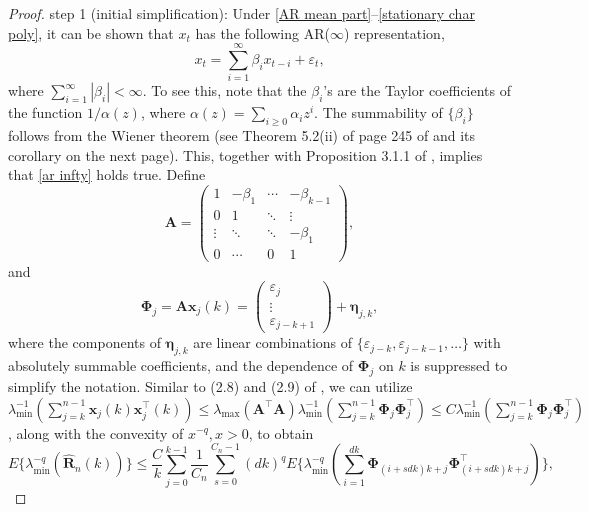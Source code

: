 \documentclass[ejsv2]{imsart}
\theoremstyle{plain}
\theoremstyle{definition}
\theoremstyle{remark}
\begin{document}
\begin{proof}
\vspace{0.3cm}
{\sc step 1 (initial simplification):}
Under \eqref{AR mean part}--\eqref{stationary char poly}, it can be shown that $x_t$ has the following AR($\infty$) representation,
\begin{equation}\label{ar infty}
x_t=\sum_{i=1}^{\infty}\beta_ix_{t-i}+\varepsilon_t,
\end{equation}
where $\sum_{i=1}^{\infty}|\beta_i|<\infty$. To see this, note that the $\beta_i$'s are the Taylor coefficients of the function $1/\alpha(z)$, where $\alpha(z) =
\sum_{i\geq0}\alpha_iz^i$. The summability of $\{\beta_i\}$ follows from the Wiener theorem (see Theorem 5.2(ii) of page 245 of \cite{Zygmund2002} and its corollary on the next page). This, together with Proposition 3.1.1 of \cite{Brockwell1991}, implies that \eqref{ar infty} holds true. Define
$$\mathbf{A}=\begin{pmatrix}
    1 & -\beta_1 & \cdots & -\beta_{k-1} \\
    0 & 1 & \ddots & \vdots \\
    \vdots & \ddots & \ddots & -\beta_1 \\
    0 & \cdots & 0 & 1
  \end{pmatrix},$$
and
\begin{equation}\label{pt.fisher.1}
\bm{\Phi}_j=\mathbf{A}\mathbf{x}_j(k)=\begin{pmatrix}
\varepsilon_j\\
\vdots\\
\varepsilon_{j-k+1}
\end{pmatrix}
+\bm{\eta}_{j,k},
\end{equation}
where the components of $\bm{\eta}_{j, k}$
are linear combinations of
$\{\varepsilon_{j-k},\varepsilon_{j-k-1},\ldots\}$
with absolutely summable coefficients,
and the dependence of $\bm{\Phi}_j$ on $k$ is suppressed to simplify the notation. 
Similar to (2.8) and (2.9) of \cite{Ing2003}, we can utilize $\lambda_{\min}^{-1}(\sum_{j=k}^{n-1}\mathbf{x}_j(k)\mathbf{x}_j^\top(k))\leq\lambda_{\max}(\mathbf{A}^\top\mathbf{A})\lambda_{\min}^{-1}(\sum_{j=k}^{n-1}\bm{\Phi}_j\bm{\Phi}_j^\top) \leq 
C \lambda_{\min}^{-1}(\sum_{j=k}^{n-1}\bm{\Phi}_j\bm{\Phi}_j^\top)$, along with the convexity of $x^{-q}, x>0$, to obtain
\begin{equation}\label{pt.fisher.2.0}
E\{\lambda_{\min}^{-q}(\hat{\mathbf{R}}_n(k))\}\leq \frac{C}{k}\sum_{j=0}^{k-1}\frac{1}{C_n}\sum_{s=0}^{C_n-1}(dk)^q E\{\lambda_{\min}^{-q}(\sum_{i=1}^{dk}\bm{\Phi}_{(i+sdk)k+j}\bm{\Phi}_{(i+sdk)k+j}^\top)\},
\end{equation}

\end{proof}
\end{document}
